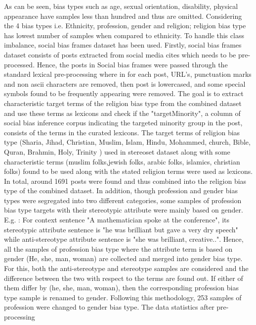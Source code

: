 As can be seen, bias types such as age, sexual orientation, disability, physical appearance have samples less than hundred and thus are omitted. Considering the 4 bias types i.e. Ethnicity, profession, gender and religion; religion bias type has lowest number of samples when compared to ethnicity. To handle this class imbalance, social bias frames dataset has been used. Firstly, social bias frames dataset consists of posts extracted from social media cites which needs to be pre-processed. Hence, the posts in Social bias frames were passed through the standard lexical pre-processing where in for each post, URL's, punctuation marks and non ascii characters are removed, then post is lowercased, and some special symbols found to be frequently appearing were removed. The goal is to extract characteristic target terms of the religion bias type from the combined dataset and use these terms as lexicons and check if the "targetMinority", a column of social bias inference corpus indicating the targeted minority group in the post, consists of the terms in the curated lexicons. The target terms of religion bias type (Sharia, Jihad, Christian, Muslim, Islam, Hindu, Mohammed, church, Bible, Quran, Brahmin, Holy, Trinity \cite{nadeem2020stereoset}) used in stereoset dataset along with some characteristic terms (muslim folks,jewish folks, arabic folks, islamics, christian folks) found to be used along with the stated religion terms were used as lexicons. In total, around 1691 posts were found and thus combined into the religion bias type of the combined dataset. In addition, though profession and gender bias types were segregated into two different categories, some samples of profession bias type targets with their stereotypic attribute were mainly based on gender. E.g. : For context sentence "A mathematician spoke at the conference", its stereotypic attribute sentence is "he was brilliant but gave a very dry speech" while anti-stereotype attribute sentence is "she was brilliant, creative..". Hence, all the samples of profession bias type where the attribute term is based on gender (He, she, man, woman) are collected and merged into gender bias type. For this, both the anti-stereotype and stereotype samples are considered and the difference between the two with respect to the terms are found out. If either of them differ by (he, she, man, woman), then the corresponding profession bias type sample is renamed to gender. Following this methodology, 253 samples of profession were changed to gender bias type.  The data statistics after pre-processing    


